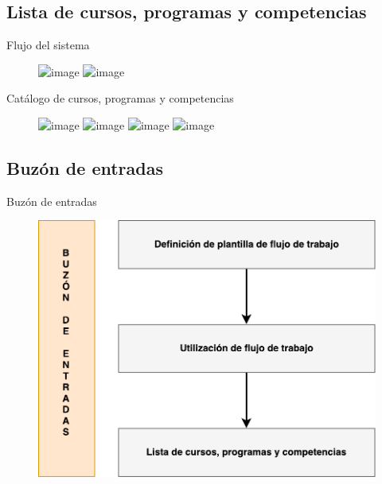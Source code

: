 \documentclass[10pt,xcolor=table]{beamer}
\begin{document}
\subsection{Lista de cursos, programas y competencias}
\begin{frame}{Flujo del sistema}
\begin{figure}
		\centering
	    \includegraphics<1>[scale=0.55]{../Figuras/Pantallas/funcionalidades_3}
	    \includegraphics<2>[scale=0.55]{../Figuras/Pantallas/funcionalidades_4}
	\end{figure}
\end{frame}

\begin{frame}{Catálogo de cursos, programas y competencias}
	\begin{figure}
		\centering
		\includegraphics<1>[scale=0.3]{../Figuras/Pantallas/curriculum_list_1}
		\includegraphics<2>[scale=0.3]{../Figuras/Pantallas/curriculum_list_2}
		\includegraphics<3>[scale=0.25]{../Figuras/Pantallas/curriculum_list_3}
		\includegraphics<4>[scale=0.3]{../Figuras/Pantallas/curriculum_list_4}
	\end{figure}
\end{frame}


\subsection{Buzón de entradas}
\begin{frame}{Buzón de entradas}
\begin{figure}
		\centering
	    \includegraphics[scale=0.55]{../Figuras/Pantallas/funcionalidades_1}
	\end{figure}
\end{frame}
\end{document}

